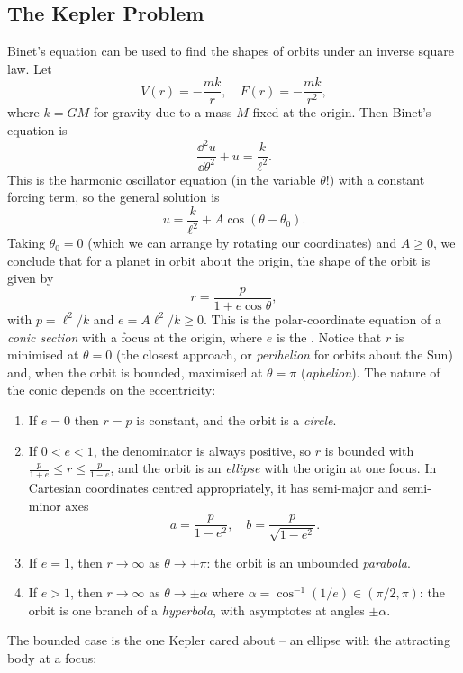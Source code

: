 \subsection{The Kepler Problem}

Binet's equation can be used to find the shapes of orbits under an inverse square law. Let
$$
V(r) = -\frac{mk}{r}, \quad F(r) = -\frac{mk}{r^2},
$$
where $k = GM$ for gravity due to a mass $M$ fixed at the origin. Then Binet's equation is
$$
\frac{\dd^2 u}{\dd \theta^2} + u = \frac{k}{\ell^2}.
$$
This is the harmonic oscillator equation (in the variable $\theta$!) with a constant forcing term, so the general solution is
$$
u = \frac{k}{\ell^2} + A \cos(\theta - \theta_0).
$$
Taking $\theta_0 = 0$ (which we can arrange by rotating our coordinates) and $A \geq 0$, we conclude that for a planet in orbit about the origin, the shape of the orbit is given by
$$
r = \frac{p}{1 + e \cos \theta},
$$
with $p = \ell^2/k$ and $e = A \ell^2/k \geq 0$. This is the polar-coordinate equation of a \emph{conic section} with a focus at the origin, where $e$ is the . Notice that $r$ is minimised at $\theta = 0$ (the closest approach, or \emph{perihelion} for orbits about the Sun) and, when the orbit is bounded, maximised at $\theta = \pi$ (\emph{aphelion}). The nature of the conic depends on the eccentricity:
\begin{enumerate}[label=(\roman*)]
	\item If $e = 0$ then $r = p$ is constant, and the orbit is a \emph{circle}.
	\item If $0 < e < 1$, the denominator is always positive, so $r$ is bounded with $\frac{p}{1 + e} \leq r \leq \frac{p}{1 - e}$, and the orbit is an \emph{ellipse} with the origin at one focus. In Cartesian coordinates centred appropriately, it has semi-major and semi-minor axes
	$$
	a = \frac{p}{1 - e^2}, \quad b = \frac{p}{\sqrt{1 - e^2}}.
	$$
	\item If $e = 1$, then $r \to \infty$ as $\theta \to \pm \pi$: the orbit is an unbounded \emph{parabola}.
	\item If $e > 1$, then $r \to \infty$ as $\theta \to \pm \alpha$ where $\alpha = \cos^{-1}(1/e) \in (\pi/2, \pi)$: the orbit is one branch of a \emph{hyperbola}, with asymptotes at angles $\pm\alpha$.
\end{enumerate}

The bounded case is the one Kepler cared about -- an ellipse with the attracting body at a focus:

